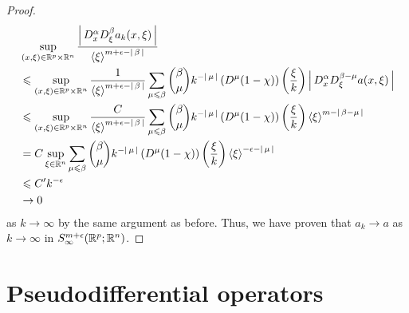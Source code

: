 \documentclass[12pt]{article}
\begin{document}
\begin{proof}
\begin{align*}
        &\sup_{(x, \xi) \in \R^p \times \R^n} \frac{\abs{D^\alpha_x D^\beta_\xi a_k(x, \xi)}}{\sym[\xi]^{m + \epsilon - \abs{\beta}}} \\
        & \leq \sup_{(x, \xi) \in \R^p \times \R^n} \frac{1}{\sym[\xi]^{m + \epsilon - \abs{\beta}}} \sum_{\mu \leq \beta} \binom{\beta}{\mu}k^{-\abs{\mu}} \brac{D^\mu (1 - \chi)}\brac{\frac{\xi}{k}} \abs{D^\alpha_x D^{\beta - \mu}_\xi a(x, \xi) } \\
        & \leq  \sup_{(x, \xi) \in \R^p \times \R^n} \frac{C}{\sym[\xi]^{m + \epsilon - \abs{\beta}}} \sum_{\mu \leq \beta} \binom{\beta}{\mu}k^{-\abs{\mu}} \brac{D^\mu (1 - \chi)}\brac{\frac{\xi}{k}} \sym[\xi]^{m - \abs{\beta - \mu}}  \\
        & = C \sup_{\xi \in \R^n} \sum_{\mu \leq \beta} \binom{\beta}{\mu}k^{-\abs{\mu}} \brac{D^\mu (1 - \chi)}\brac{\frac{\xi}{k}} \sym[\xi]^{- \epsilon - \abs{\mu}}  \\
        & \leq C' k^{- \epsilon} \\
        & \to 0
    \end{align*}
    as $k \to \infty$ by the same argument as before. Thus, we have proven that $a_k \to a$ as $k \to \infty$ in $S^{m + \epsilon}_\infty(\R^p; \R^n)$. 
    
\end{proof}




\section{Pseudodifferential operators}
\end{document}

